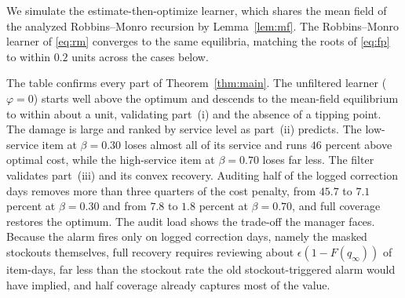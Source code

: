 \documentclass[11pt]{article}
\theoremstyle{plain}
\begin{document}
We simulate the estimate-then-optimize learner, which shares the mean field of the
analyzed Robbins--Monro recursion by Lemma~\ref{lem:mf}. The Robbins--Monro learner
of \eqref{eq:rm} converges to the same equilibria, matching the roots of
\eqref{eq:fp} to within $0.2$ units across the cases below.

The table confirms every part of Theorem~\ref{thm:main}. The unfiltered learner
($\varphi=0$) starts well above the optimum and descends to the mean-field
equilibrium to within about a unit, validating part~(i) and the absence of a
tipping point. The damage is large and ranked by service level as part~(ii)
predicts. The low-service item at $\beta=0.30$ loses almost all of its service and
runs $46$ percent above optimal cost, while the high-service item at $\beta=0.70$
loses far less. The filter validates part~(iii) and its convex recovery. Auditing
half of the logged correction days removes more than three quarters of the cost
penalty, from $45.7$ to $7.1$ percent at $\beta=0.30$ and from $7.8$ to $1.8$
percent at $\beta=0.70$, and full coverage restores the optimum. The audit load
shows the trade-off the manager faces. Because the alarm fires only on logged
correction days, namely the masked stockouts themselves, full recovery requires
reviewing about $\epsilon(1-F(q_\infty))$ of item-days, far less than the stockout
rate the old stockout-triggered alarm would have implied, and half coverage already
captures most of the value.


\end{document}
